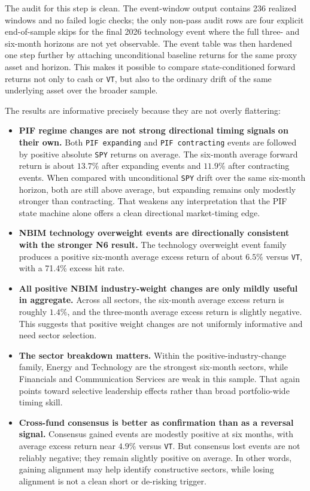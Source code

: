 \documentclass[conference]{IEEEtran}
\begin{document}
The audit for this step is clean. The event-window output contains 236 realized windows and no failed logic checks; the only non-pass audit rows are four explicit end-of-sample skips for the final 2026 technology event where the full three- and six-month horizons are not yet observable. The event table was then hardened one step further by attaching unconditional baseline returns for the same proxy asset and horizon. This makes it possible to compare state-conditioned forward returns not only to cash or \texttt{VT}, but also to the ordinary drift of the same underlying asset over the broader sample.

The results are informative precisely because they are not overly flattering:
\begin{itemize}[leftmargin=1.4em]
    \item \textbf{PIF regime changes are not strong directional timing signals on their own.} Both \texttt{PIF expanding} and \texttt{PIF contracting} events are followed by positive absolute \texttt{SPY} returns on average. The six-month average forward return is about $13.7\%$ after expanding events and $11.9\%$ after contracting events. When compared with unconditional \texttt{SPY} drift over the same six-month horizon, both are still above average, but expanding remains only modestly stronger than contracting. That weakens any interpretation that the PIF state machine alone offers a clean directional market-timing edge.
    \item \textbf{NBIM technology overweight events are directionally consistent with the stronger N6 result.} The technology overweight event family produces a positive six-month average excess return of about $6.5\%$ versus \texttt{VT}, with a 71.4\% excess hit rate.
    \item \textbf{All positive NBIM industry-weight changes are only mildly useful in aggregate.} Across all sectors, the six-month average excess return is roughly $1.4\%$, and the three-month average excess return is slightly negative. This suggests that positive weight changes are not uniformly informative and need sector selection.
    \item \textbf{The sector breakdown matters.} Within the positive-industry-change family, Energy and Technology are the strongest six-month sectors, while Financials and Communication Services are weak in this sample. That again points toward selective leadership effects rather than broad portfolio-wide timing skill.
    \item \textbf{Cross-fund consensus is better as confirmation than as a reversal signal.} Consensus gained events are modestly positive at six months, with average excess return near $4.9\%$ versus \texttt{VT}. But consensus lost events are not reliably negative; they remain slightly positive on average. In other words, gaining alignment may help identify constructive sectors, while losing alignment is not a clean short or de-risking trigger.
\end{itemize}
\end{document}
